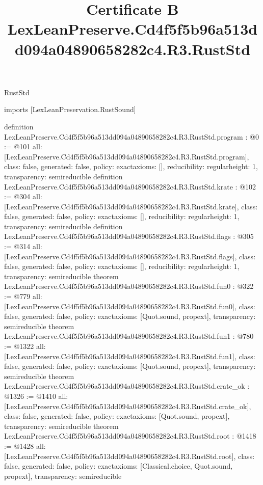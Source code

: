 \begin{lexlean}{RustStd}
\title{Certificate B LexLeanPreserve.Cd4f5f5b96a513dd094a04890658282c4.R3.RustStd}
\begin{coremodule}
imports [LexLeanPreservation.RustSound]

definition LexLeanPreserve.Cd4f5f5b96a513dd094a04890658282c4.R3.RustStd.program : @0 := @101 {
  all: [LexLeanPreserve.Cd4f5f5b96a513dd094a04890658282c4.R3.RustStd.program],
  class: false,
  generated: false,
  policy: exact{axioms: []},
  reducibility: regular{height: 1},
  transparency: semireducible
}
definition LexLeanPreserve.Cd4f5f5b96a513dd094a04890658282c4.R3.RustStd.krate : @102 := @304 {
  all: [LexLeanPreserve.Cd4f5f5b96a513dd094a04890658282c4.R3.RustStd.krate],
  class: false,
  generated: false,
  policy: exact{axioms: []},
  reducibility: regular{height: 1},
  transparency: semireducible
}
definition LexLeanPreserve.Cd4f5f5b96a513dd094a04890658282c4.R3.RustStd.flags : @305 := @314 {
  all: [LexLeanPreserve.Cd4f5f5b96a513dd094a04890658282c4.R3.RustStd.flags],
  class: false,
  generated: false,
  policy: exact{axioms: []},
  reducibility: regular{height: 1},
  transparency: semireducible
}
theorem LexLeanPreserve.Cd4f5f5b96a513dd094a04890658282c4.R3.RustStd.fun0 : @322 := @779 {
  all: [LexLeanPreserve.Cd4f5f5b96a513dd094a04890658282c4.R3.RustStd.fun0],
  class: false,
  generated: false,
  policy: exact{axioms: [Quot.sound, propext]},
  transparency: semireducible
}
theorem LexLeanPreserve.Cd4f5f5b96a513dd094a04890658282c4.R3.RustStd.fun1 : @780 := @1322 {
  all: [LexLeanPreserve.Cd4f5f5b96a513dd094a04890658282c4.R3.RustStd.fun1],
  class: false,
  generated: false,
  policy: exact{axioms: [Quot.sound, propext]},
  transparency: semireducible
}
theorem LexLeanPreserve.Cd4f5f5b96a513dd094a04890658282c4.R3.RustStd.crate_ok : @1326 := @1410 {
  all: [LexLeanPreserve.Cd4f5f5b96a513dd094a04890658282c4.R3.RustStd.crate_ok],
  class: false,
  generated: false,
  policy: exact{axioms: [Quot.sound, propext]},
  transparency: semireducible
}
theorem LexLeanPreserve.Cd4f5f5b96a513dd094a04890658282c4.R3.RustStd.root : @1418 := @1428 {
  all: [LexLeanPreserve.Cd4f5f5b96a513dd094a04890658282c4.R3.RustStd.root],
  class: false,
  generated: false,
  policy: exact{axioms: [Classical.choice, Quot.sound, propext]},
  transparency: semireducible
}


\end{coremodule}
\end{lexlean}
